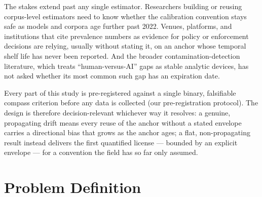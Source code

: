\documentclass[conference]{IEEEtran}
\begin{document}
The stakes extend past any single estimator. Researchers building or reusing corpus-level estimators need to know whether the calibration convention stays safe as models and corpora age further past 2022. Venues, platforms, and institutions that cite prevalence numbers as evidence for policy or enforcement decisions are relying, usually without stating it, on an anchor whose temporal shelf life has never been reported. And the broader contamination-detection literature, which treats ``human-versus-AI'' gaps as stable analytic devices, has not asked whether its most common such gap has an expiration date.

Every part of this study is pre-registered against a single binary, falsifiable compass criterion before any data is collected (our pre-registration protocol). The design is therefore decision-relevant whichever way it resolves: a genuine, propagating drift means every reuse of the anchor without a stated envelope carries a directional bias that grows as the anchor ages; a flat, non-propagating result instead delivers the first quantified license --- bounded by an explicit envelope --- for a convention the field has so far only assumed.

\section{Problem Definition}\label{sec:problem}
\end{document}
